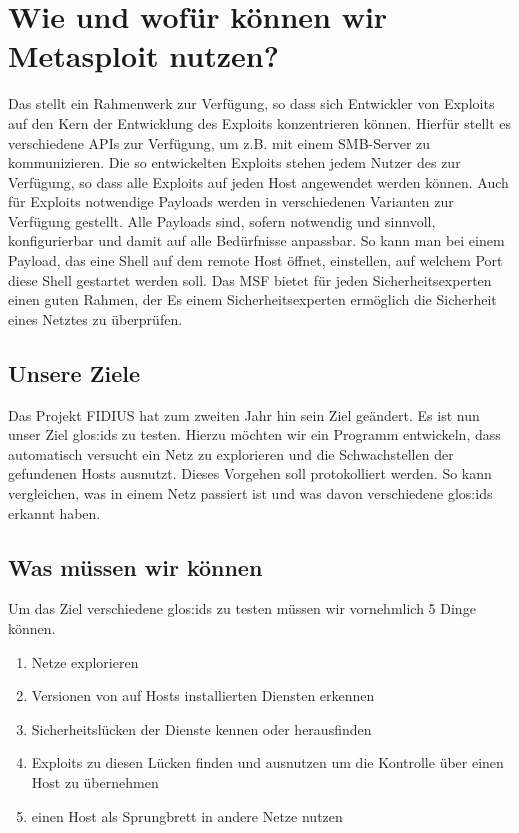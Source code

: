 \section{Wie und wofür können wir Metasploit nutzen?}
\label{compositions:msf}

Das  stellt ein Rahmenwerk zur Verfügung, so dass
sich Entwickler von Exploits auf den Kern der Entwicklung des Exploits
konzentrieren können. Hierfür stellt es verschiedene APIs zur Verfügung,
um z.B. mit einem SMB-Server zu kommunizieren.
Die so entwickelten Exploits stehen jedem Nutzer des  zur
Verfügung, so dass alle Exploits auf jeden Host angewendet werden
können. 
Auch für Exploits notwendige Payloads werden in verschiedenen
Varianten zur Verfügung gestellt. Alle Payloads sind, sofern
notwendig und sinnvoll, konfigurierbar und damit auf alle Bedürfnisse
anpassbar. So kann man bei einem Payload, das eine Shell auf dem remote
Host öffnet, einstellen, auf welchem Port diese Shell gestartet werden
soll. 
Das MSF bietet für jeden Sicherheitsexperten einen guten Rahmen, der
Es einem Sicherheitsexperten ermöglich die Sicherheit eines Netztes zu
überprüfen.

\subsection{Unsere Ziele}

Das Projekt FIDIUS hat zum zweiten Jahr hin sein Ziel geändert. Es ist
nun unser Ziel \gls{glos:ids} zu testen. Hierzu möchten wir
ein Programm entwickeln, dass automatisch versucht ein Netz zu
explorieren und die Schwachstellen der gefundenen Hosts
ausnutzt. Dieses Vorgehen soll protokolliert werden. So kann
vergleichen, was in einem Netz passiert ist und was davon verschiedene
\gls{glos:ids} erkannt haben.

\subsection{Was müssen wir können}

Um das Ziel verschiedene \gls{glos:ids} zu testen müssen wir
vornehmlich 5 Dinge können.
\begin{enumerate}
  \item Netze explorieren
  \item Versionen von auf Hosts installierten Diensten erkennen
  \item Sicherheitslücken der Dienste kennen oder herausfinden
  \item Exploits zu diesen Lücken finden und ausnutzen um die Kontrolle
    über einen Host zu übernehmen
  \item einen Host als Sprungbrett in andere Netze nutzen
\end{enumerate}

